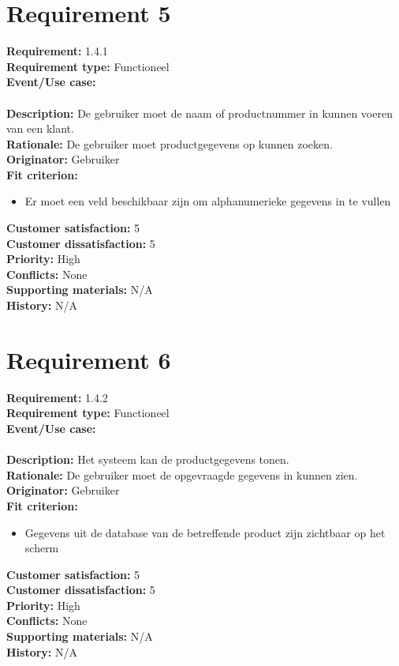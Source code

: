 \documentclass[11pt,english]{article}
\begin{document}
	\newpage
	\section{Requirement 5}
	\textbf{Requirement:} 1.4.1 \\
	\textbf{Requirement type:} Functioneel \\
	\textbf{Event/Use case:} \\
	\\
	\textbf{Description:} De gebruiker moet de naam of productnummer in kunnen voeren van een klant. \\
	\textbf{Rationale:} De gebruiker moet productgegevens op kunnen zoeken. \\
	\textbf{Originator:} Gebruiker \\
	\textbf{Fit criterion:}
	\begin{itemize}
		\item Er moet een veld beschikbaar zijn om alphanumerieke gegevens in te vullen
	\end{itemize}
	\textbf{Customer satisfaction:} 5 \\
	\textbf{Customer dissatisfaction:} 5 \\
	\textbf{Priority:} High \\
	\textbf{Conflicts:} None \\
	\textbf{Supporting materials:} N/A \\
	\textbf{History:} N/A \\

	\newpage
	\section{Requirement 6}
	\textbf{Requirement:} 1.4.2 \\
	\textbf{Requirement type:} Functioneel \\
	\textbf{Event/Use case:} \\
	\\
	\textbf{Description:} Het systeem kan de productgegevens tonen. \\
	\textbf{Rationale:} De gebruiker moet de opgevraagde gegevens in kunnen zien. \\
	\textbf{Originator:} Gebruiker \\
	\textbf{Fit criterion:}
	\begin{itemize}
		\item Gegevens uit de database van de betreffende product zijn zichtbaar op het scherm
	\end{itemize}
	\textbf{Customer satisfaction:} 5 \\
	\textbf{Customer dissatisfaction:} 5 \\
	\textbf{Priority:} High \\
	\textbf{Conflicts:} None \\
	\textbf{Supporting materials:} N/A \\
	\textbf{History:} N/A \\
\end{document}
